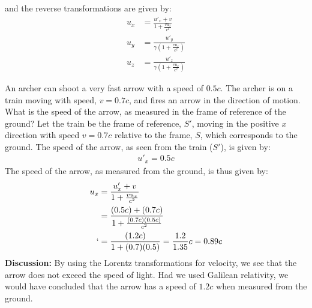 and the reverse transformations are given by:
\begin{align*}
u_x &=\frac{u'_x +v}{1+ \frac{vu_x}{c^2}}\\
u_y &=\frac{u'_y}{\gamma\left(1+ \frac{vu_x}{c^2}\right)}\\
u_z &=\frac{u'_z}{\gamma\left(1+ \frac{vu_x}{c^2}\right)}
\end{align*}
\begin{example}{An archer can shoot a very fast arrow with a speed of $0.5c$. The archer is on a train moving with speed, $v=0.7c$, and fires an arrow in the direction of motion. What is the speed of the arrow, as measured in the frame of reference of the ground?}
Let the train be the frame of reference, $S'$, moving in the positive $x$ direction with speed $v=0.7c$ relative to the frame, $S$, which corresponds to the ground. The speed of the arrow, as seen from the train ($S'$), is given by:
\begin{align*}
u'_x = 0.5c
\end{align*}
The speed of the arrow, as measured from the ground, is thus given by:
\begin{align*}
u_x &=\frac{u'_x +v}{1+ \frac{vu_x}{c^2}}\\
&=\frac{(0.5c) +(0.7c)}{1+ \frac{(0.7c)(0.5c)}{c^2}}\\`
&=\frac{(1.2c)}{1+(0.7)(0.5)}=\frac{1.2}{1.35}c=0.89c
\end{align*}
\textbf{Discussion:} By using the Lorentz transformations for velocity, we see that the arrow does not exceed the speed of light. Had we used Galilean relativity, we would have concluded that the arrow has a speed of $1.2c$ when measured from the ground. 
\end{example}

